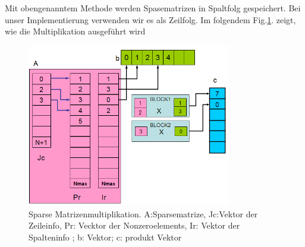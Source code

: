 



Mit obengenanntem Methode werden Spasematrizen in Spaltfolg gespeichert. Bei unser Implementierung verwenden wir es als Zeilfolg. Im folgendem Fig.\ref{sparseMul}. zeigt, wie die Multiplikation ausgeführt wird

\begin{figure}[htbp]
\includegraphics[width=3.5in]{.//pic//sparseMul}
\caption{Sparse Matrizenmultiplikation. A:Sparsematrize, Jc:Vektor der Zeileinfo, Pr: Vecktor der Nonzeroelements, Ir: Vektor der Spalteninfo ; b: Vektor; c: produkt Vektor}
\label{sparseMul} 
\end{figure}